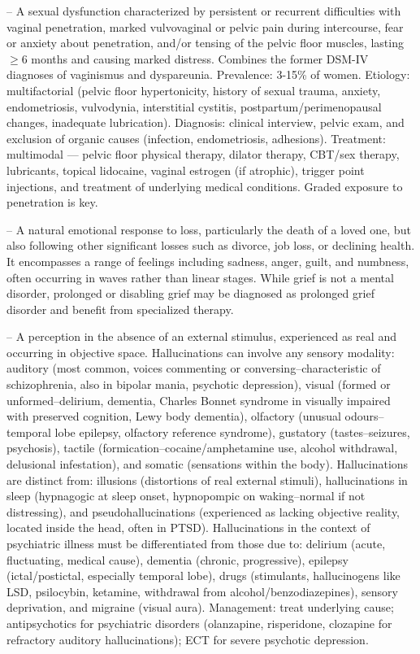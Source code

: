 -- A sexual dysfunction characterized by persistent or recurrent difficulties with vaginal penetration, marked vulvovaginal or pelvic pain during intercourse, fear or anxiety about penetration, and/or tensing of the pelvic floor muscles, lasting \(\ge\)6 months and causing marked distress. Combines the former DSM-IV diagnoses of vaginismus and dyspareunia. Prevalence: 3-15\% of women. Etiology: multifactorial (pelvic floor hypertonicity, history of sexual trauma, anxiety, endometriosis, vulvodynia, interstitial cystitis, postpartum/perimenopausal changes, inadequate lubrication). Diagnosis: clinical interview, pelvic exam, and exclusion of organic causes (infection, endometriosis, adhesions). Treatment: multimodal — pelvic floor physical therapy, dilator therapy, CBT/sex therapy, lubricants, topical lidocaine, vaginal estrogen (if atrophic), trigger point injections, and treatment of underlying medical conditions. Graded exposure to penetration is key.

-- A natural emotional response to loss, particularly the death of a loved one, but also following other significant losses such as divorce, job loss, or declining health. It encompasses a range of feelings including sadness, anger, guilt, and numbness, often occurring in waves rather than linear stages. While grief is not a mental disorder, prolonged or disabling grief may be diagnosed as prolonged grief disorder and benefit from specialized therapy.

-- A perception in the absence of an external stimulus, experienced as real and occurring in objective space. Hallucinations can involve any sensory modality: auditory (most common, voices commenting or conversing--characteristic of schizophrenia, also in bipolar mania, psychotic depression), visual (formed or unformed--delirium, dementia, Charles Bonnet syndrome in visually impaired with preserved cognition, Lewy body dementia), olfactory (unusual odours--temporal lobe epilepsy, olfactory reference syndrome), gustatory (tastes--seizures, psychosis), tactile (formication--cocaine/amphetamine use, alcohol withdrawal, delusional infestation), and somatic (sensations within the body). Hallucinations are distinct from: illusions (distortions of real external stimuli), hallucinations in sleep (hypnagogic at sleep onset, hypnopompic on waking--normal if not distressing), and pseudohallucinations (experienced as lacking objective reality, located inside the head, often in PTSD). Hallucinations in the context of psychiatric illness must be differentiated from those due to: delirium (acute, fluctuating, medical cause), dementia (chronic, progressive), epilepsy (ictal/postictal, especially temporal lobe), drugs (stimulants, hallucinogens like LSD, psilocybin, ketamine, withdrawal from alcohol/benzodiazepines), sensory deprivation, and migraine (visual aura). Management: treat underlying cause; antipsychotics for psychiatric disorders (olanzapine, risperidone, clozapine for refractory auditory hallucinations); ECT for severe psychotic depression.

